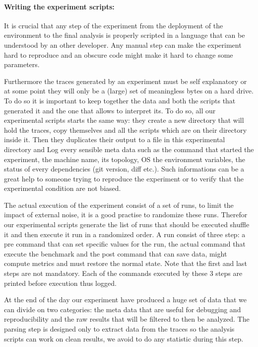 \paragraph{Writing the experiment scripts:}

It is crucial that any step of the experiment from the deployment of the
environment to the final analysis is properly scripted in a language that can
be understood by an other developer. Any manual step can make the experiment
hard to reproduce and an obscure code might make it hard to change some
parameters.

Furthermore the traces generated by an experiment must be self explanatory or
at some point they will only be a (large) set of meaningless bytes on a hard
drive. To do so it is important to keep together the data and both the scripts
that generated it and the one that allows to interpret its. To do so, all our
experimental scripts starts the same way: they create a new directory that
will hold the traces, copy themselves and all the scripts which are on their
directory inside it. Then they duplicates their output to a file in this
experimental directory and Log every sensible meta data such as the
command that started the experiment, the machine name, its topology, \gls{OS}
the environment variables, the status of every dependencies (git version, diff
etc.). Such informations can be a great help to someone trying to reproduce
the experiment or to verify that the experimental condition are not biased.

The actual execution of the experiment consist of a set of runs, to limit the
impact of external noise, it is a good practise to randomize these runs.
Therefor our experimental scripts generate the list of runs that should be
executed shuffle it and then execute it run in a randomized order. A run
consist of three step: a pre command that can set specific values for the run,
the actual command that execute the benchmark and the post command that can
save data, might compute metrics and must restore the normal state. Note that
the first and last steps are not mandatory. Each of the commands executed by
these 3 steps are printed before execution thus logged.

At the end of the day our experiment have produced a huge set of data that we
can divide on two categories: the meta data that are useful for debugging and
reproducibility and the raw results that will be filtered to then be analyzed.
The parsing step is designed only to extract data from the traces so the
analysis scripts can work on clean results, we avoid to do any statistic
during this step.

